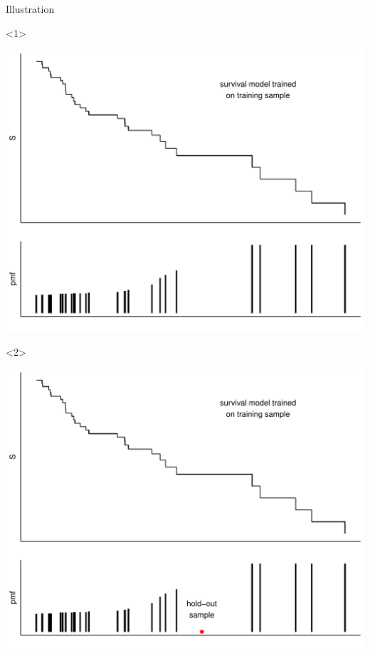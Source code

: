 \documentclass[smaller]{beamer}\usepackage{listings}
\begin{document}
\begin{frame}[label={sec:org725f1ca}]{Illustration}
\begin{onlyenv}<1>
\begin{center}
\includegraphics[width=.9\linewidth]{fig-km-surv.pdf}
\end{center}
\end{onlyenv}

\begin{onlyenv}<2>
\begin{center}
\includegraphics[width=.9\linewidth]{fig-km-surv2.pdf}
\end{center}
\end{onlyenv}
\end{frame}
\end{document}
